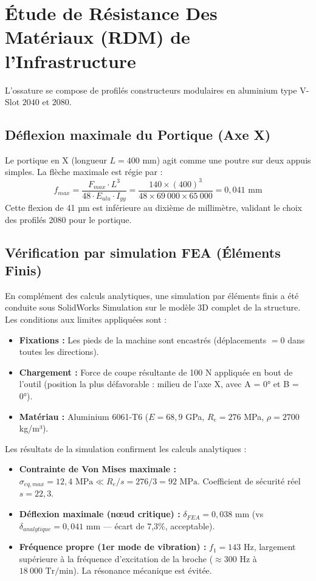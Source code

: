 \section{Étude de Résistance Des Matériaux (RDM) de l'Infrastructure}

L'ossature se compose de profilés constructeurs modulaires en aluminium type V-Slot $2040$ et $2080$.

\subsection{Déflexion maximale du Portique (Axe X)}
Le portique en X (longueur $L=400 \text{ mm}$) agit comme une poutre sur deux appuis simples. La flèche maximale est régie par :
\begin{equation}
    f_{max} = \frac{F_{max} \cdot L^3}{48 \cdot E_{alu} \cdot I_{yy}} = \frac{140 \times (400)^3}{48 \times 69~000 \times 65~000} = \boxed{0{,}041 \text{ mm}}
\end{equation}
Cette flexion de 41 µm est inférieure au dixième de millimètre, validant le choix des profilés 2080 pour le portique.

\subsection{Vérification par simulation FEA (Éléments Finis)}
En complément des calculs analytiques, une simulation par éléments finis a été conduite sous SolidWorks Simulation sur le modèle 3D complet de la structure. Les conditions aux limites appliquées sont :
\begin{itemize}
    \item \textbf{Fixations :} Les pieds de la machine sont encastrés (déplacements $= 0$ dans toutes les directions).
    \item \textbf{Chargement :} Force de coupe résultante de 100 N appliquée en bout de l'outil (position la plus défavorable : milieu de l'axe X, avec A = 0° et B = 0°).
    \item \textbf{Matériau :} Aluminium 6061-T6 ($E = 68{,}9$ GPa, $R_e = 276$ MPa, $\rho = 2700$ kg/m³).
\end{itemize}

Les résultats de la simulation confirment les calculs analytiques :
\begin{itemize}
    \item \textbf{Contrainte de Von Mises maximale :} $\sigma_{eq,max} = 12{,}4 \text{ MPa} \ll R_e/s = 276/3 = 92 \text{ MPa}$. Coefficient de sécurité réel $s = 22{,}3$.
    \item \textbf{Déflexion maximale (nœud critique) :} $\delta_{FEA} = 0{,}038 \text{ mm}$ (vs $\delta_{analytique} = 0{,}041 \text{ mm}$ — écart de 7{,}3\%, acceptable).
    \item \textbf{Fréquence propre (1er mode de vibration) :} $f_1 = 143 \text{ Hz}$, largement supérieure à la fréquence d'excitation de la broche ($\approx 300 \text{ Hz}$ à $18~000 \text{ Tr/min}$). La résonance mécanique est évitée.
\end{itemize}

